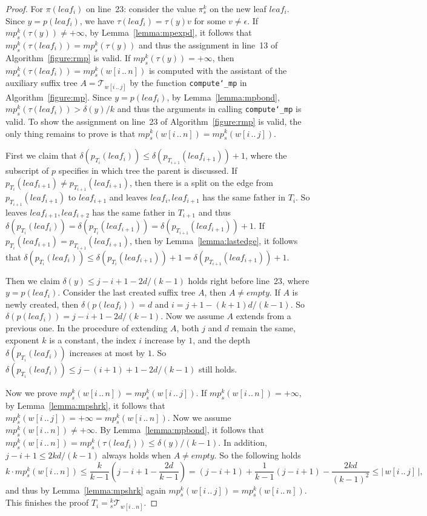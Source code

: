 \documentclass{article}
\def\us{\char`\_}
\def\subw#1#2#3{{#1[#2\,..\,#3]}}
\def\abs#1{{|\,#1\,|}}
\def\tree{\mathcal{T}}
\begin{document}
\begin{proof}
For $\pi(leaf_i)$ on line~23: consider the value $\pi_s^k$ on the
new leaf $leaf_i$. Since $y=p(leaf_i)$, we have
$\tau(leaf_i)=\tau(y)v$ for some $v\neq\epsilon$. If
$mp_s^k(\tau(y))\neq+\infty$, by Lemma~\ref{lemma:mpexpd}, it
follows that $mp_s^k(\tau(leaf_i))=mp_s^k(\tau(y))$ and thus the
assignment in line~13 of Algorithm~\ref{figure:rmp} is valid. If
$mp_s^k(\tau(y))=+\infty$, then
$mp_s^k(\tau(leaf_i))=mp_s^k(\subw{w}{i}{n})$ is computed with the
assistant of the auxiliary suffix tree $A=\tree_{\subw{w}{i}{j}}$ by
the function {\tt compute\us mp} in Algorithm~\ref{figure:mp}. Since
$y=p(leaf_i)$, by Lemma~\ref{lemma:mpbond},
$mp_s^k(\tau(leaf_i))>\delta(y)/k$ and thus the arguments in calling
{\tt compute\us mp} is valid. To show the assignment on line~23 of
Algorithm~\ref{figure:rmp} is valid, the only thing remains to prove
is that $mp_s^k(\subw{w}{i}{n})=mp_s^k(\subw{w}{i}{j})$.

First we claim that
$\delta(p_{T_{i}}(leaf_{i}))\leq\delta(p_{T_{i+1}}(leaf_{i+1}))+1$,
where the subscript of $p$ specifies in which tree the parent is
discussed. If $p_{T_{i}}(leaf_{i+1})\neq p_{T_{i+1}}(leaf_{i+1})$,
then there is a split on the edge from $p_{T_{i+1}}(leaf_{i+1})$ to
$leaf_{i+1}$ and leaves $leaf_i,leaf_{i+1}$ has the same father in
$T_i$. So leaves $leaf_{i+1},leaf_{i+2}$ has the same father in
$T_{i+1}$ and thus
  $\delta(p_{T_{i}}(leaf_{i}))
  =\delta(p_{T_{i}}(leaf_{i+1}))
  =\delta(p_{T_{i+1}}(leaf_{i+1}))+1.$
If $p_{T_{i}}(leaf_{i+1})=p_{T_{i+1}}(leaf_{i+1})$, then by
Lemma~\ref{lemma:lastedge}, it follows that
  $\delta(p_{T_{i}}(leaf_{i}))
  \leq\delta(p_{T_{i}}(leaf_{i+1}))+1
  =\delta(p_{T_{i+1}}(leaf_{i+1}))+1.$


Then we claim $\delta(y)\leq j-i+1-2d/(k-1)$ holds right before
line~23, where $y=p(leaf_i)$. Consider the last created suffix tree
$A$, then $A\neq empty$. If $A$ is newly created, then
$\delta(p(leaf_i))=d$ and $i=j+1-(k+1)d/(k-1)$. So
$\delta(p(leaf_i))=j-i+1-2d/(k-1)$. Now we assume $A$ extends from a
previous one. In the procedure of extending $A$, both $j$ and $d$
remain the same, exponent $k$ is a constant, the index $i$ increase
by $1$, and the depth $\delta(p_{T_{i}}(leaf_{i}))$ increases at
most by $1$. So $\delta(p_{T_{i}}(leaf_{i}))\leq j-(i+1)+1-2d/(k-1)$
still holds.


Now we prove $mp_s^k(\subw{w}{i}{n})=mp_s^k(\subw{w}{i}{j})$. If
$mp_s^k(\subw{w}{i}{n})=+\infty$, by Lemma~\ref{lemma:mpshrk}, it
follows that
$mp_s^k(\subw{w}{i}{j})=+\infty=mp_s^k(\subw{w}{i}{n})$. Now we
assume $mp_s^k(\subw{w}{i}{n})\neq+\infty$. By
Lemma~\ref{lemma:mpbond}, it follows that
$mp_s^k(\subw{w}{i}{n})=mp_s^k(\tau(leaf_i))\leq\delta(y)/(k-1)$. In
addition, $j-i+1\leq2kd/(k-1)$ always holds when $A\neq empty$. So
the following holds
  \[k\cdot mp_s^k(\subw{w}{i}{n}) \leq\frac{k}{k-1}\left(j-i+1-\frac{2d}{k-1}\right)
  =(j-i+1)+\frac{1}{k-1}(j-i+1)-\frac{2kd}{(k-1)^2} \leq\abs{\subw{w}{i}{j}},\]
and thus by Lemma~\ref{lemma:mpshrk} again
$mp_s^k(\subw{w}{i}{j})=mp_s^k(\subw{w}{i}{n})$. This finishes the
proof $T_i={}_s^k\tree_{\subw{w}{i}{n}}$.
\end{proof}
\end{document}
